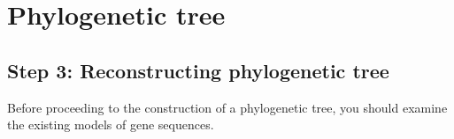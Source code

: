 % 
% 

\section{Phylogenetic tree}

\subsection{Step 3: Reconstructing phylogenetic tree}

Before proceeding to the construction of a phylogenetic tree, you should examine the 
existing models of gene sequences.

